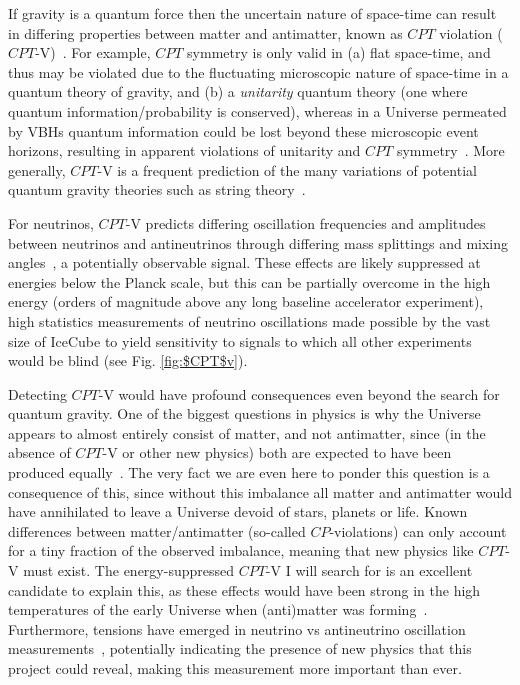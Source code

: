 \documentclass[a4paper,11pt]{article}
\begin{document}
If gravity is a quantum force then the uncertain nature of space-time can result in differing properties between matter and antimatter, known as $CPT$ violation ($CPT$-V)~\cite{Mavromatos:2005mi, AmelinoCamelia:2008qg, RalfLehnert:2016grl}. For example, $CPT$ symmetry is only valid in (a) flat space-time, and thus may be violated due to the fluctuating microscopic nature of  space-time in a quantum theory of gravity, and (b) a \textit{unitarity} quantum theory (one where quantum information/probability is conserved), whereas in a Universe permeated by VBHs quantum information could be lost beyond these microscopic event horizons, resulting in apparent violations of unitarity and $CPT$ symmetry~\cite{Mavromatos:2005mi}. More generally, $CPT$-V is a frequent prediction of the many variations of potential quantum gravity theories such as string theory~\cite{Mavromatos:2005mi, Hashimoto:2014aoa, Ellis:2013gca}.

For neutrinos, $CPT$-V predicts differing oscillation frequencies and amplitudes between neutrinos and antineutrinos through differing mass splittings and mixing angles~\cite{Barenboim:2017ewj}, a potentially observable signal. These effects are likely suppressed at energies below the Planck scale, but this can be partially overcome in the high energy (orders of magnitude above any long baseline accelerator experiment), high statistics measurements of neutrino oscillations made possible by the vast size of IceCube  to yield sensitivity to signals to which all other experiments would be blind (see Fig. \ref{fig:$CPT$v}). 

Detecting $CPT$-V would have profound consequences even beyond the search for quantum gravity. One of the biggest questions in physics is why the Universe appears to almost entirely consist of matter, and not antimatter, since (in the absence of $CPT$-V or other new physics) both are expected to have been produced equally~\cite{Sakharov_1991}. The very fact we are even here to ponder this question is a consequence of this, since without this imbalance all matter and antimatter would have annihilated to leave a Universe devoid of stars, planets or life. Known differences between matter/antimatter (so-called $CP$-violations) can only account for a tiny fraction of the observed imbalance, meaning that new physics like $CPT$-V must exist. The energy-suppressed $CPT$-V I will search for is an excellent candidate to explain this, as these effects would have been strong in the high temperatures of the early Universe when (anti)matter was forming~\cite{Mavromatos:2017cxr, hep-ph/9809542, Ellis:2013gca}. Furthermore, tensions have emerged in neutrino vs antineutrino oscillation measurements~\cite{Abe:2019vii,NOvA_CP_result}, potentially indicating the presence of new physics that this project could reveal, making this measurement more important than ever.
\end{document}
